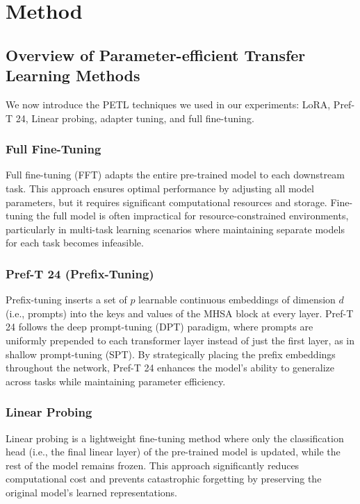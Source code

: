 \documentclass[11pt]{article}
\begin{document}
\section{Method}
\subsection{Overview of Parameter-efficient Transfer Learning Methods}

We now introduce the PETL techniques we used in our experiments: LoRA, Pref-T 24, Linear probing, adapter tuning, and full fine-tuning.

\subsubsection{Full Fine-Tuning}
Full fine-tuning (FFT) adapts the entire pre-trained model to each downstream task. This approach ensures optimal performance by adjusting all model parameters, but it requires significant computational resources and storage. Fine-tuning the full model is often impractical for resource-constrained environments, particularly in multi-task learning scenarios where maintaining separate models for each task becomes infeasible.

\subsubsection{Pref-T 24 (Prefix-Tuning)}
Prefix-tuning inserts a set of $p$ learnable continuous embeddings of dimension $d$ (i.e., prompts) into the keys and values of the MHSA block at every layer. Pref-T 24 follows the deep prompt-tuning (DPT) paradigm, where prompts are uniformly prepended to each transformer layer instead of just the first layer, as in shallow prompt-tuning (SPT). By strategically placing the prefix embeddings throughout the network, Pref-T 24 enhances the model’s ability to generalize across tasks while maintaining parameter efficiency.

\subsubsection{Linear Probing}
Linear probing is a lightweight fine-tuning method where only the classification head (i.e., the final linear layer) of the pre-trained model is updated, while the rest of the model remains frozen. This approach significantly reduces computational cost and prevents catastrophic forgetting by preserving the original model’s learned representations.
\end{document}
